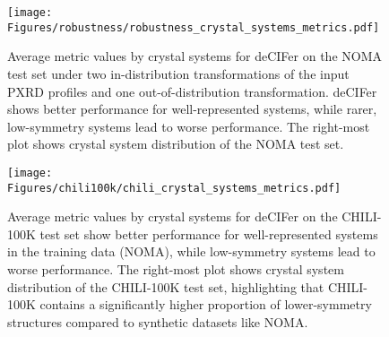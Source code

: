 \begin{figure}[t!]
\vskip 0.2in
\begin{center}
\centerline{\texttt{[image: Figures/robustness/robustness\_crystal\_systems\_metrics.pdf]}}
\caption{
Average metric values by crystal systems for deCIFer on the NOMA test set under two in-distribution transformations of the input PXRD profiles and one out-of-distribution transformation. deCIFer shows better performance for well-represented systems, while rarer, low-symmetry systems lead to worse performance. The right-most plot shows crystal system distribution of the NOMA test set.
}
\label{fig:barplot_robustness}
\end{center}
\vskip -0.2in
\end{figure}

\begin{figure}[t!]
\vskip 0.2in
\begin{center}
\centerline{\texttt{[image: Figures/chili100k/chili\_crystal\_systems\_metrics.pdf]}}
\caption{
Average metric values by crystal systems for deCIFer on the CHILI-100K test set show better performance for well-represented systems in the training data (NOMA), while low-symmetry systems lead to worse performance. The right-most plot shows crystal system distribution of the CHILI-100K test set, highlighting that CHILI-100K contains a significantly higher proportion of lower-symmetry structures compared to synthetic datasets like NOMA.
}
\label{fig:barplot_chili}
\end{center}
\vskip -0.2in
\end{figure}

